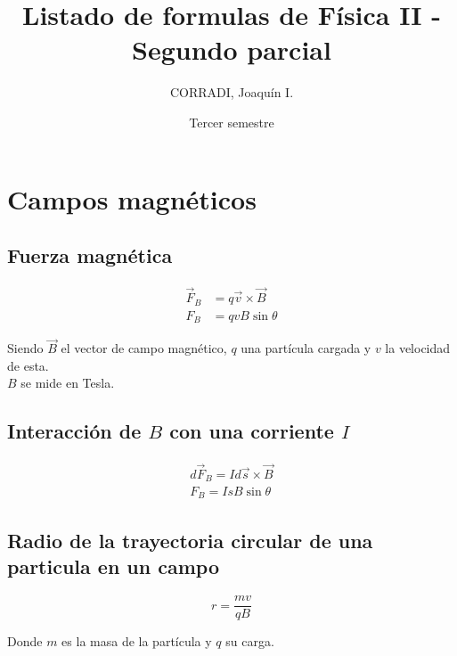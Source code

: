 \documentclass[a4, 12pt]{report}
\title{Listado de formulas de Física II - Segundo parcial}
\date{Tercer semestre}
\author{CORRADI, Joaquín I.}
\begin{document}
  \maketitle
  \setcounter{tocdepth}{5}
  \tableofcontents
  \newpage

  \chapter*{Campos magnéticos}

    \section*{Fuerza magnética}
      
      \begin{align*}
        \vec{F}_B&=q\vec{v}\times\vec{B}\\
        F_B&=qvB\sin{\theta}
      \end{align*}

      Siendo $\vec{B}$ el vector de campo magnético, $q$ una partícula cargada
      y $v$ la velocidad de esta.\\
      \indent$B$ se mide en Tesla.

    \section*{Interacción de $B$ con una corriente $I$}

    \begin{align*}
      d\vec{F}_B=Id\vec{s}\times\vec{B}\\
      F_B=IsB\sin{\theta}
    \end{align*}

    \section*{Radio de la trayectoria circular de una particula en un campo}

      \begin{equation*}
        r=\frac{mv}{qB}
      \end{equation*}

      \indent Donde $m$ es la masa de la partícula y $q$ su carga.
\end{document}
